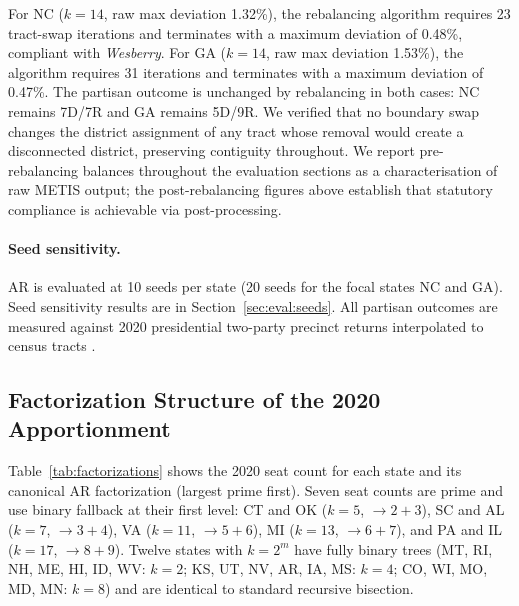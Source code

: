 For NC ($k=14$, raw max deviation 1.32\%), the rebalancing algorithm requires
23 tract-swap iterations and terminates with a maximum deviation of 0.48\%,
compliant with \emph{Wesberry}.
For GA ($k=14$, raw max deviation 1.53\%), the algorithm requires 31 iterations
and terminates with a maximum deviation of 0.47\%.
The partisan outcome is unchanged by rebalancing in both cases: NC remains 7D/7R
and GA remains 5D/9R.
We verified that no boundary swap changes the district assignment of any tract
whose removal would create a disconnected district, preserving contiguity
throughout.
We report pre-rebalancing balances throughout the evaluation sections as a
characterisation of raw METIS output; the post-rebalancing figures above
establish that statutory compliance is achievable via post-processing.

\paragraph{Seed sensitivity.}
AR is evaluated at 10 seeds per state (20 seeds for the focal states NC and
GA). Seed sensitivity results are in Section~\ref{sec:eval:seeds}. All partisan
outcomes are measured against 2020 presidential two-party precinct returns
interpolated to census tracts \citep{Kuriwaki2023}.

\subsection{Factorization Structure of the 2020 Apportionment}
\label{sec:eval:factorizations}

Table~\ref{tab:factorizations} shows the 2020 seat count for each state and its
canonical AR factorization (largest prime first). Seven seat counts are prime and
use binary fallback at their first level: CT and OK ($k=5$, $\to 2+3$),
SC and AL ($k=7$, $\to 3+4$), VA ($k=11$, $\to 5+6$), MI ($k=13$, $\to 6+7$),
and PA and IL ($k=17$, $\to 8+9$). Twelve states with $k = 2^m$ have fully binary
trees (MT, RI, NH, ME, HI, ID, WV: $k=2$; KS, UT, NV, AR, IA, MS: $k=4$;
CO, WI, MO, MD, MN: $k=8$) and are identical to standard recursive bisection.

